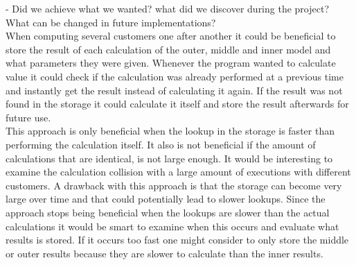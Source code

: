 - Did we achieve what we wanted? what did we discover during the project? What can be changed in future implementations? \\

When computing several customers one after another it could be beneficial to store the result of each calculation of the outer, middle and inner model and what parameters they were given. Whenever the program wanted to calculate value it could check if the calculation was already performed at a previous time and instantly get the result instead of calculating it again. If the result was not found in the storage it could calculate it itself and store the result afterwards for future use. \\
This approach is only beneficial when the lookup in the storage is faster than performing the calculation itself. It also is not beneficial if the amount of calculations that are identical, is not large enough. It would be interesting to examine the calculation collision with a large amount of executions with different customers. A drawback with this approach is that the storage can become very large over time and that could potentially lead to slower lookups. Since the approach stops being beneficial when the lookups are slower than the actual calculations it would be smart to examine when this occurs and evaluate what results is stored. If it occurs too fast one might consider to only store the middle or outer results because they are slower to calculate than the inner results.
